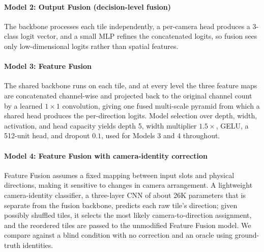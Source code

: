 \paragraph{Model 2: Output Fusion (decision-level fusion)} The backbone processes each tile independently, a per-camera head produces a 3-class logit vector, and a small MLP refines the concatenated logits, so fusion sees only low-dimensional logits rather than spatial features.
\paragraph{Model 3: Feature Fusion} The shared backbone runs on each tile, and at every level the three feature maps are concatenated channel-wise and projected back to the original channel count by a learned $1\times1$ convolution, giving one fused multi-scale pyramid from which a shared head produces the per-direction logits. Model selection over depth, width, activation, and head capacity yields depth 5, width multiplier $1.5\times$, GELU, a 512-unit head, and dropout $0.1$, used for Models 3 and 4 throughout.


\paragraph{Model 4: Feature Fusion with camera-identity correction}
Feature Fusion assumes a fixed mapping between input slots and physical
directions, making it sensitive to changes in camera arrangement. A lightweight camera-identity classifier, a three-layer CNN of about 26K parameters that is separate from the fusion backbone, predicts each raw tile's
direction; given possibly shuffled tiles, it selects the most likely
camera-to-direction assignment, and the reordered tiles are passed to the
unmodified Feature Fusion model. We compare against a blind condition with no
correction and an oracle using ground-truth identities.



